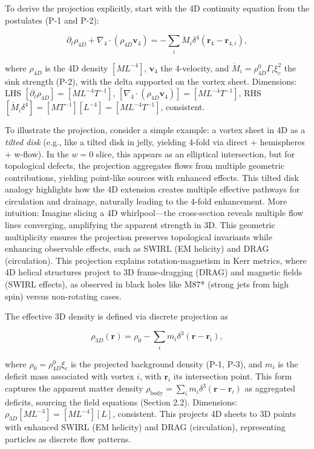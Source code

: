 To derive the projection explicitly, start with the 4D continuity equation from the postulates (P-1 and P-2):

\begin{equation}
\partial_t \rho_{4D} + \nabla_4 \cdot (\rho_{4D} \mathbf{v}_4) = -\sum_i \dot{M}_i \delta^4(\mathbf{r}_4 - \mathbf{r}_{4,i}),
\end{equation}

where $\rho_{4D}$ is the 4D density $[M L^{-4}]$, $\mathbf{v}_4$ the 4-velocity, and $\dot{M}_i = \rho_{4D}^0 \Gamma_i \xi_c^2$ the sink strength (P-2), with the delta supported on the vortex sheet. Dimensions: LHS $[\partial_t \rho_{4D}] = [M L^{-4} T^{-1}]$, $[\nabla_4 \cdot (\rho_{4D} \mathbf{v}_4)] = [M L^{-4} T^{-1}]$, RHS $[\dot{M}_i \delta^4] = [M T^{-1}] [L^{-4}] = [M L^{-4} T^{-1}]$, consistent.

To illustrate the projection, consider a simple example: a vortex sheet in 4D as a \emph{tilted disk} (e.g., like a tilted disk in jelly, yielding 4-fold via direct + hemispheres + w-flow). In the $w=0$ slice, this appears as an elliptical intersection, but for topological defects, the projection aggregates flows from multiple geometric contributions, yielding point-like sources with enhanced effects. This tilted disk analogy highlights how the 4D extension creates multiple effective pathways for circulation and drainage, naturally leading to the 4-fold enhancement. More intuition: Imagine slicing a 4D whirlpool---the cross-section reveals multiple flow lines converging, amplifying the apparent strength in 3D. This geometric multiplicity ensures the projection preserves topological invariants while enhancing observable effects, such as SWIRL (EM helicity) and DRAG (circulation). This projection explains rotation-magnetism in Kerr metrics, where 4D helical structures project to 3D frame-dragging (DRAG) and magnetic fields (SWIRL effects), as observed in black holes like M87* (strong jets from high spin) versus non-rotating cases.

The effective 3D density is defined via discrete projection as

\begin{equation}
\rho_{3D}(\mathbf{r}) = \rho_0 - \sum_i m_i \delta^3(\mathbf{r} - \mathbf{r}_i),
\end{equation}

where $\rho_0 = \rho_{4D}^0 \xi_c$ is the projected background density (P-1, P-3), and $m_i$ is the deficit mass associated with vortex $i$, with $\mathbf{r}_i$ its intersection point. This form captures the apparent matter density $\rho_{\text{body}} = \sum_i m_i \delta^3(\mathbf{r} - \mathbf{r}_i)$ as aggregated deficits, sourcing the field equations (Section 2.2). Dimensions: $\rho_{3D} [M L^{-3}] = [M L^{-4}] [L]$, consistent. This projects 4D sheets to 3D points with enhanced SWIRL (EM helicity) and DRAG (circulation), representing particles as discrete flow patterns.

